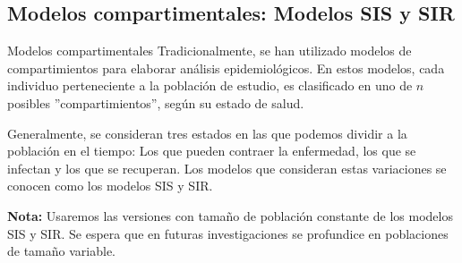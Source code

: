 \documentclass[9pt]{beamer}
\begin{document}
\subsection{Modelos compartimentales: Modelos SIS y SIR}
\begin{frame}{Modelos compartimentales}
Tradicionalmente, se han utilizado modelos de compartimientos para elaborar análisis epidemiológicos. En estos modelos, cada individuo perteneciente a la población de estudio, es clasificado en uno de $n$ posibles ''compartimientos'', según su estado de salud.

Generalmente, se consideran tres estados en las que podemos dividir a la población en el tiempo: Los que pueden contraer la enfermedad, los que se infectan y los que se recuperan. Los modelos que consideran estas variaciones se conocen como los modelos SIS y SIR.

\textbf{Nota:} Usaremos las versiones con tamaño de población constante de los modelos SIS y SIR. Se espera que en futuras investigaciones se profundice en poblaciones de tamaño variable.
\end{frame}
\end{document}
